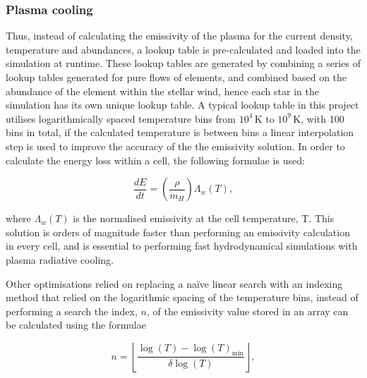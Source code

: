 \subsubsection{Plasma cooling}



Thus, instead of calculating the emissivity of the plasma for the current density, temperature and abundances, a lookup table is pre-calculated and loaded into the simulation at runtime.
These lookup tables are generated by combining a series of lookup tables generated for pure flows of elements, and combined based on the abundance of the element within the stellar wind, hence each star in the simulation has its own unique lookup table.
A typical lookup table in this project utilises logarithmically spaced temperature bins from $10^4\,\si{\kelvin}$ to $10^9\,\si{\kelvin}$, with 100 bins in total, if the calculated temperature is between bins a linear interpolation step is used to improve the accuracy of the the emissivity solution.
In order to calculate the energy loss within a cell, the following formulae is used:

\begin{equation}
  \frac{dE}{dt} = \left(\frac{\rho}{m_H}\right) \Lambda_w (T) ,
\end{equation}

\noindent
where $\Lambda_w(T)$ is the normalised emissivity at the cell temperature, T.
This solution is orders of magnitude faster than performing an emissivity calculation in every cell, and is essential to performing fast hydrodynamical simulations with plasma radiative cooling.



Other optimisations relied on replacing a na\"ive linear search with an indexing method that relied on the logarithmic spacing of the temperature bins, instead of performing a search the index, $n$, of the emissivity value stored in an array can be calculated using the formulae

\begin{equation}
    n = \left \lfloor \frac{\log(T) - \log(T)_\text{min}}{\delta \log (T)} \right \rfloor ,
\end{equation}

